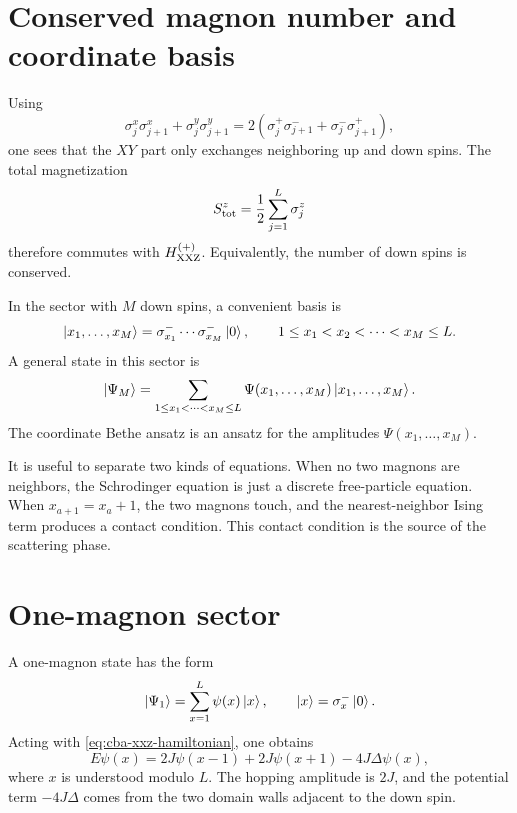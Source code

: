\section{Conserved magnon number and coordinate basis}
\label{sec:cba-coordinate-basis}

Using
\begin{equation}
    \sigma_j^x\sigma_{j+1}^x+\sigma_j^y\sigma_{j+1}^y
    =
    2\left(\sigma_j^+\sigma_{j+1}^-+\sigma_j^-\sigma_{j+1}^+\right),
\end{equation}
one sees that the $XY$ part only exchanges neighboring up and down spins.  The
total magnetization
\begin{equation}
\label{eq:cba-total-magnetization}
    S^z_{\rm tot}=\frac12\sum_{j=1}^{L}\sigma_j^z
\end{equation}
therefore commutes with $H_{\rm XXZ}^{(+)}$.  Equivalently, the number of down
spins is conserved.

In the sector with $M$ down spins, a convenient basis is
\begin{equation}
\label{eq:cba-magnon-coordinate-basis}
    \left|x_1,\ldots,x_M\right\rangle
    =
    \sigma_{x_1}^-\cdots\sigma_{x_M}^-\left|0\right\rangle,
    \qquad
    1\leq x_1<x_2<\cdots<x_M\leq L .
\end{equation}
A general state in this sector is
\begin{equation}
\label{eq:cba-general-M-magnon-state}
    \left|\Psi_M\right\rangle
    =
    \sum_{1\leq x_1<\cdots<x_M\leq L}
    \Psi(x_1,\ldots,x_M)\left|x_1,\ldots,x_M\right\rangle .
\end{equation}
The coordinate Bethe ansatz is an ansatz for the amplitudes
$\Psi(x_1,\ldots,x_M)$.

It is useful to separate two kinds of equations.  When no two magnons are
neighbors, the Schrodinger equation is just a discrete free-particle equation.
When $x_{a+1}=x_a+1$, the two magnons touch, and the nearest-neighbor Ising term
produces a contact condition.  This contact condition is the source of the
scattering phase.

\section{One-magnon sector}
\label{sec:cba-one-magnon-sector}

A one-magnon state has the form
\begin{equation}
\label{eq:cba-one-magnon-state}
    \left|\Psi_1\right\rangle
    =
    \sum_{x=1}^{L}\psi(x)\left|x\right\rangle,
    \qquad
    \left|x\right\rangle=\sigma_x^-\left|0\right\rangle .
\end{equation}
Acting with \cref{eq:cba-xxz-hamiltonian}, one obtains
\begin{equation}
\label{eq:cba-one-magnon-difference-equation}
    E\psi(x)
    =
    2J\psi(x-1)+2J\psi(x+1)-4J\Delta\psi(x),
\end{equation}
where $x$ is understood modulo $L$.  The hopping amplitude is $2J$, and the
potential term $-4J\Delta$ comes from the two domain walls adjacent to the down
spin.

